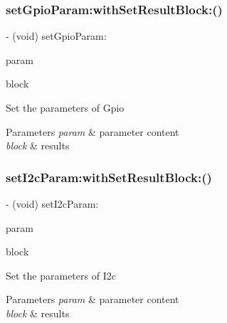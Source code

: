 \subsubsection{\texorpdfstring{set\+Gpio\+Param\+:with\+Set\+Result\+Block\+:()}{setGpioParam:withSetResultBlock:()}}
{\footnotesize\ttfamily -\/ (void) set\+Gpio\+Param\+: \begin{DoxyParamCaption}\item[{(\hyperlink{struct_p_v_s_d_k___m_o_u_n_t_a_p_i___g_p_i_o___p_a_r_a_m}{P\+V\+S\+D\+K\+\_\+\+M\+O\+U\+N\+T\+A\+P\+I\+\_\+\+G\+P\+I\+O\+\_\+\+P\+A\+R\+AM})}]{param }\item[{withSetResultBlock:(P\+V\+Set\+Param\+Result\+Block)}]{block }\end{DoxyParamCaption}}

Set the parameters of Gpio


\begin{DoxyParams}{Parameters}
{\em param} & parameter content \\
\hline
{\em block} & results \\
\hline
\end{DoxyParams}
\mbox{\label{interface_p_v_mount_controller_a750c2e7102443f1561a805722c192e73}} 
\subsubsection{\texorpdfstring{set\+I2c\+Param\+:with\+Set\+Result\+Block\+:()}{setI2cParam:withSetResultBlock:()}}
{\footnotesize\ttfamily -\/ (void) set\+I2c\+Param\+: \begin{DoxyParamCaption}\item[{(\hyperlink{struct_p_v_s_d_k___m_o_u_n_t_a_p_i___i2_c___p_a_r_a_m}{P\+V\+S\+D\+K\+\_\+\+M\+O\+U\+N\+T\+A\+P\+I\+\_\+\+I2\+C\+\_\+\+P\+A\+R\+AM})}]{param }\item[{withSetResultBlock:(P\+V\+Set\+Param\+Result\+Block)}]{block }\end{DoxyParamCaption}}

Set the parameters of I2c


\begin{DoxyParams}{Parameters}
{\em param} & parameter content \\
\hline
{\em block} & results \\
\hline
\end{DoxyParams}
\mbox{\label{interface_p_v_mount_controller_acade0baa3de226826dabbc1405fc7d1f}} 
